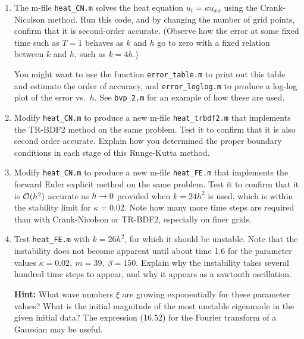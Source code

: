 

\begin{enumerate} 
\item The m-file \verb+heat_CN.m+ solves
the heat equation $u_t = \kappa u_{xx}$ using the Crank-Nicolson method.
Run this code, and by changing the number of grid points, confirm that it is
second-order accurate.  (Observe how the error at some fixed time such as $T=1$
behaves as $k$ and $h$ go to zero with a fixed relation between $k$ and $h$,
such as $k = 4h$.)

You might want to use the function \verb+error_table.m+ to print out this
table and estimate the order of accuracy, and \verb+error_loglog.m+ to
produce a log-log plot of the error vs.\ $h$.  See \verb+bvp_2.m+ for an
example of how these are used.

\item Modify \verb+heat_CN.m+ to produce a new m-file \verb+heat_trbdf2.m+ that
implements the TR-BDF2 method on the same problem.  Test it to confirm that
it is also second order accurate.  Explain how you determined the proper
boundary conditions in each stage of this Runge-Kutta method.

\item Modify \verb+heat_CN.m+ to produce a new m-file \verb+heat_FE.m+ that
implements the forward Euler explicit 
method on the same problem.  Test it to confirm that
it is ${\mathcal O}(h^2)$ accurate as $h\rightarrow 0$ provided when $k = 24 h^2$ is
used, which is within the stability limit for $\kappa = 0.02$.  Note how
many more time steps are required than with Crank-Nicolson or TR-BDF2,
especially on finer grids.

\item Test \verb+heat_FE.m+ with $k = 26 h^2$, for which it should be
unstable.  Note that the instability does not become apparent until about
time 1.6 for the parameter values $\kappa = 0.02,~ m=39,~\beta = 150$.
Explain why the instability takes several hundred time steps to appear, and
why it appears as a sawtooth oscillation. 

{\bf Hint:} What wave numbers $\xi$ are growing exponentially for these
parameter values?  What is the initial magnitude of the most unstable
eigenmode in the given initial data?  The expression (16.52) for the Fourier
transform of a Gaussian may be useful.

\end{enumerate}


